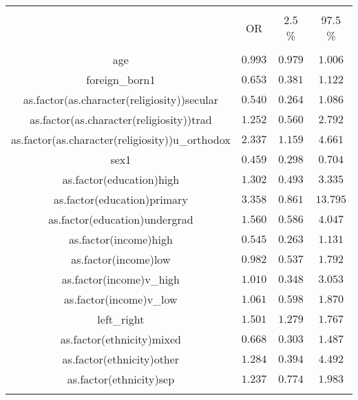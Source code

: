 \documentclass[12pt,letterpaper]{article}
\begin{document}
	
\begin{table}[!htbp] \centering 
	\caption{} 
	\label{} 
	\begin{tabular}{@{\extracolsep{5pt}} cccc} 
		\\[-1.8ex]\hline 
		\hline \\[-1.8ex] 
		& OR & 2.5 \% & 97.5 \% \\ 
		\hline \\[-1.8ex] 
		age & $0.993$ & $0.979$ & $1.006$ \\ 
		foreign\_born1 & $0.653$ & $0.381$ & $1.122$ \\ 
		as.factor(as.character(religiosity))secular & $0.540$ & $0.264$ & $1.086$ \\ 
		as.factor(as.character(religiosity))trad & $1.252$ & $0.560$ & $2.792$ \\ 
		as.factor(as.character(religiosity))u\_orthodox & $2.337$ & $1.159$ & $4.661$ \\ 
		sex1 & $0.459$ & $0.298$ & $0.704$ \\ 
		as.factor(education)high & $1.302$ & $0.493$ & $3.335$ \\ 
		as.factor(education)primary & $3.358$ & $0.861$ & $13.795$ \\ 
		as.factor(education)undergrad & $1.560$ & $0.586$ & $4.047$ \\ 
		as.factor(income)high & $0.545$ & $0.263$ & $1.131$ \\ 
		as.factor(income)low & $0.982$ & $0.537$ & $1.792$ \\ 
		as.factor(income)v\_high & $1.010$ & $0.348$ & $3.053$ \\ 
		as.factor(income)v\_low & $1.061$ & $0.598$ & $1.870$ \\ 
		left\_right & $1.501$ & $1.279$ & $1.767$ \\ 
		as.factor(ethnicity)mixed & $0.668$ & $0.303$ & $1.487$ \\ 
		as.factor(ethnicity)other & $1.284$ & $0.394$ & $4.492$ \\ 
		as.factor(ethnicity)sep & $1.237$ & $0.774$ & $1.983$ \\ 
		\hline \\[-1.8ex] 
	\end{tabular} 
\end{table} 
\newpage
\end{document}
